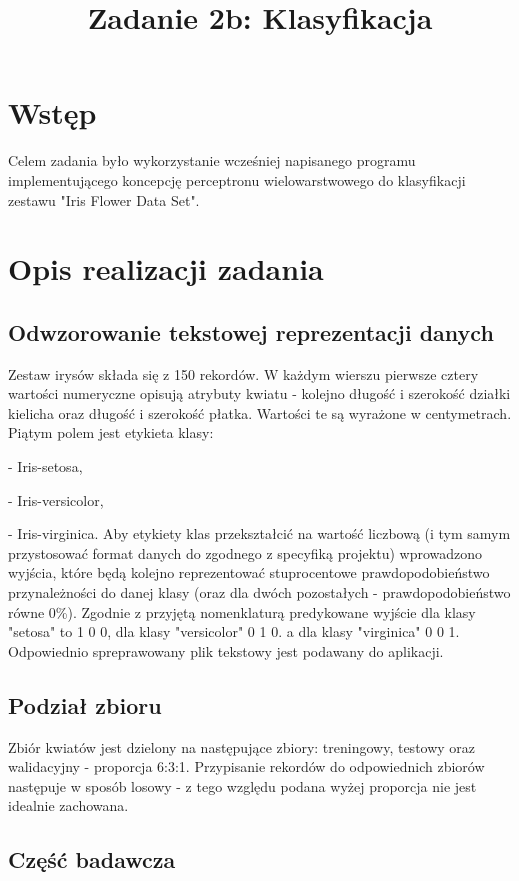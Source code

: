 \documentclass{classrep}
\author{
  \studentinfo{Marcin Pajkowski}{211968} \and
  \studentinfo{Rafał Warda}{214067}
}
\title{Zadanie 2b: Klasyfikacja}
\begin{document}
\maketitle
\newpage
\section{Wstęp}
Celem zadania było wykorzystanie wcześniej napisanego programu implementującego koncepcję perceptronu wielowarstwowego do klasyfikacji zestawu "Iris Flower Data Set".

\section{Opis realizacji zadania}
\subsection{Odwzorowanie tekstowej reprezentacji danych}
Zestaw irysów składa się z 150 rekordów. W każdym wierszu pierwsze cztery wartości numeryczne opisują atrybuty kwiatu - kolejno długość i szerokość działki kielicha oraz długość i szerokość płatka. Wartości te są wyrażone w centymetrach. Piątym polem jest etykieta klasy:

- Iris-setosa,

- Iris-versicolor,

- Iris-virginica.
\newline
Aby etykiety klas przekształcić na wartość liczbową (i tym samym przystosować format danych do zgodnego z specyfiką projektu) wprowadzono wyjścia, które będą kolejno reprezentować stuprocentowe prawdopodobieństwo przynależności do danej klasy (oraz dla dwóch pozostałych - prawdopodobieństwo równe 0\%). Zgodnie z przyjętą nomenklaturą predykowane wyjście dla klasy "setosa" to 1 0 0, dla klasy "versicolor" 0 1 0. a dla klasy "virginica" 0 0 1. Odpowiednio spreprawowany plik tekstowy jest podawany do aplikacji.
\subsection{Podział zbioru}
Zbiór kwiatów jest dzielony na następujące zbiory: treningowy, testowy oraz walidacyjny - proporcja 6:3:1.
Przypisanie rekordów do odpowiednich zbiorów następuje w sposób losowy - z tego względu podana wyżej proporcja nie jest idealnie zachowana.
\subsection{Część badawcza}
\end{document}
